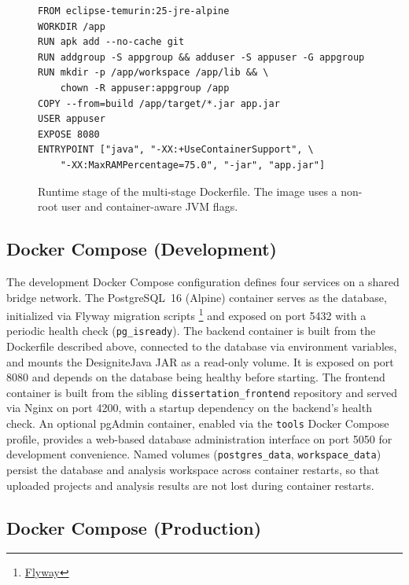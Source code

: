 \begin{figure}[htbp]
    \begin{verbatim}
FROM eclipse-temurin:25-jre-alpine
WORKDIR /app
RUN apk add --no-cache git
RUN addgroup -S appgroup && adduser -S appuser -G appgroup
RUN mkdir -p /app/workspace /app/lib && \
    chown -R appuser:appgroup /app
COPY --from=build /app/target/*.jar app.jar
USER appuser
EXPOSE 8080
ENTRYPOINT ["java", "-XX:+UseContainerSupport", \
    "-XX:MaxRAMPercentage=75.0", "-jar", "app.jar"]
    \end{verbatim}
    \caption{Runtime stage of the multi-stage Dockerfile. The image uses a non-root user and container-aware JVM flags.}
    \label{lst:dockerfile-runtime}
\end{figure}

\subsection{Docker Compose (Development)}
\label{subsec:docker-dev}

 \par The development Docker Compose configuration defines four services on a shared bridge network. The PostgreSQL~16 (Alpine) container serves as the database, initialized via Flyway migration scripts \footnote{\href{https://github.com/flyway/flyway}{Flyway}} and exposed on port 5432 with a periodic health check (\texttt{pg\_isready}). The backend container is built from the Dockerfile described above, connected to the database via environment variables, and mounts the DesigniteJava JAR as a read-only volume. It is exposed on port 8080 and depends on the database being healthy before starting. The frontend container is built from the sibling \texttt{dissertation\_frontend} repository and served via Nginx on port 4200, with a startup dependency on the backend's health check. An optional pgAdmin container, enabled via the \texttt{tools} Docker Compose profile, provides a web-based database administration interface on port 5050 for development convenience. Named volumes (\texttt{postgres\_data}, \texttt{workspace\_data}) persist the database and analysis workspace across container restarts, so that uploaded projects and analysis results are not lost during container restarts.

\subsection{Docker Compose (Production)}
\label{subsec:docker-prod}

